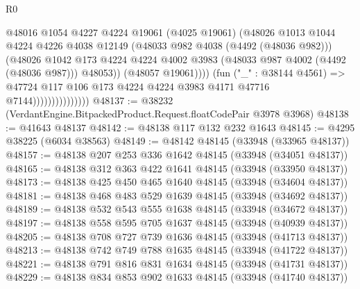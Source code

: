 \begin{lexlean}{R0}
\begin{coremodule}
                                    @48016
                                      @1054
                                      @4227
                                      @4224
                                      @19061
                                      (@4025 @19061)
                                      (@48026
                                        @1013
                                        @1044
                                        @4224
                                        @4226
                                        @4038
                                        @12149
                                        (@48033 @982 @4038 (@4492 (@48036 @982)))
                                        (@48026
                                          @1042
                                          @173
                                          @4224
                                          @4224
                                          @4002
                                          @3983
                                          (@48033 @987 @4002 (@4492 (@48036 @987)))
                                          @48053))
                                      (@48057 @19061))))
                                (fun ("_" : @38144 @4561) =>
                                @47724
                                  @117
                                  @106
                                  @173
                                  @4224
                                  @4224
                                  @3983
                                  @4171
                                  @47716
                                  @7144)))))))))))))))
@48137 := @38232 (VerdantEngine.BitpackedProduct.Request.floatCodePair @3978 @3968)
@48138 := @41643 @48137
@48142 := @48138 @117 @132 @232 @1643
@48145 := @4295 @38225 (@6034 @38563)
@48149 := @48142 @48145 (@33948 (@33965 @48137))
@48157 := @48138 @207 @253 @336 @1642 @48145 (@33948 (@34051 @48137))
@48165 := @48138 @312 @363 @422 @1641 @48145 (@33948 (@33950 @48137))
@48173 := @48138 @425 @450 @465 @1640 @48145 (@33948 (@34604 @48137))
@48181 := @48138 @468 @483 @529 @1639 @48145 (@33948 (@34692 @48137))
@48189 := @48138 @532 @543 @555 @1638 @48145 (@33948 (@34672 @48137))
@48197 := @48138 @558 @595 @705 @1637 @48145 (@33948 (@40939 @48137))
@48205 := @48138 @708 @727 @739 @1636 @48145 (@33948 (@41713 @48137))
@48213 := @48138 @742 @749 @788 @1635 @48145 (@33948 (@41722 @48137))
@48221 := @48138 @791 @816 @831 @1634 @48145 (@33948 (@41731 @48137))
@48229 := @48138 @834 @853 @902 @1633 @48145 (@33948 (@41740 @48137))

\end{coremodule}
\end{lexlean}
